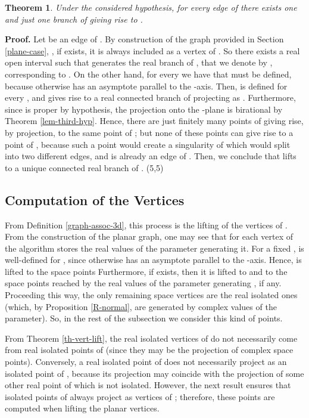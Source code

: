 \documentclass{elsart}
\def\qed{\hfill  \framebox(5,5){}}
\newtheorem{theorem}{{\bf Theorem}}
\begin{document}
\begin{theorem} \label{th-edges-lift}
Under the considered hypothesis, for every edge  of  there exists one and just one branch of  giving rise to .
\end{theorem}

{\bf Proof.} Let  be an edge of . By
construction of the graph provided in Section \ref{plane-case}, ,
if  exists, it is always included as a vertex of
. So there exists a real open interval
 such that  generates the real branch
of , that we denote by ,
corresponding to . On the other hand, for every  we
have that  must be defined, because otherwise 
has an asymptote parallel to the -axis. Then,  is
defined for every , and gives rise to a real connected
branch of  projecting as .
Furthermore, since  is proper by hypothesis, the
projection onto the -plane is birational by Theorem
\ref{lem-third-hyp}. Hence, there are just finitely many points of
 giving rise, by projection, to the same point of
; but none of these points can give rise
to a point of , because such a point would create a
singularity of  which would split 
into two different edges, and  is already an edge of
. Then, we conclude that 
lifts to a unique connected real branch of . \qed

\subsection{Computation of the Vertices}\label{vertices-3d}
From Definition \ref{graph-assoc-3d}, this process is the lifting of the vertices of
. From the construction of the planar
graph, one may see that for each vertex  of
 the algorithm stores the real values
 of the parameter generating it. For a
fixed ,  is well-defined for ,
since otherwise  has an asymptote parallel to the
-axis. Hence,  is lifted to the space points
 Furthermore, if  exists, then it is lifted to  and to the space points reached by
the real values of the parameter generating , if any. Proceeding this way, the only remaining
space vertices are the real isolated ones (which, by Proposition \ref{R-normal}, are generated
by complex values of the parameter). So, in the rest of the subsection we consider this kind of points.

From Theorem \ref{th-vert-lift}, the real isolated vertices of
 do not necessarily come from real
isolated points of  (since they may be the
projection of complex space points). Conversely, a real isolated
point of  does not necessarily project as an
isolated point of , because its projection
may coincide with the projection of some other real point of
 which is not isolated. However, the next result
ensures that isolated points of  always project as
vertices of ; therefore, these points are
computed when lifting the planar vertices.
\end{document}
